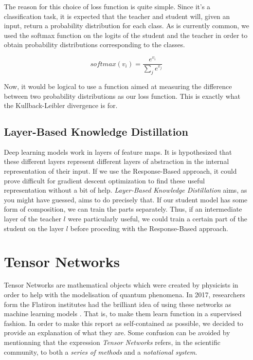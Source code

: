 \documentclass{article}
\theoremstyle{definition}
\theoremstyle{definition}
\begin{document}
The reason for this choice of loss function is quite simple. Since it's a classification task, it is expected that the teacher and student will, given an input, return a probability distribution for each class. As is currently common, we used the softmax function on the logits of the student and the teacher in order to obtain probability distributions corresponding to the classes. 

\begin{equation}
    softmax(v_i) = \frac{e^{v_i}}{\sum_{j}{e^{v_j}}}
\end{equation}

Now, it would be logical to use a function aimed at measuring the difference between two probability distributions as our loss function. This is exactly what the Kullback-Leibler divergence is for.

\subsection{Layer-Based Knowledge Distillation}
Deep learning models work in layers of feature maps. It is hypothesized that
these different layers represent different layers of abstraction in the internal
representation of their input. If we use the Response-Based approach, it could prove difficult for gradient descent optimization to find these useful representation without a bit of help. {\it Layer-Based Knowledge Distillation} aims, as you might have guessed, aims to do precisely that. If our student model has some form of composition, we can train the parts separately. Thus, if an intermediate layer of the teacher $l$ were particularly useful, we could train a certain part of the student on the layer $l$ before proceding with the Response-Based approach.



\section{Tensor Networks}
Tensor Networks are mathematical objects which were created by physicists in order to help with the modelisation of quantum phenomena.
In 2017, researchers form the Flatiron institutes had the brilliant idea of using these networks as machine learning models \cite{stoudenmire2017supervised}. That is, to make them learn function in a supervised fashion. In order to make this report as self-contained as possible, we decided to provide an explanation of what they are. Some confusion can be avoided by mentionning that the expression \emph{Tensor Networks} refers, in the scientific community, to both a \emph{series of methods} and a \emph{notational system}.
\end{document}
